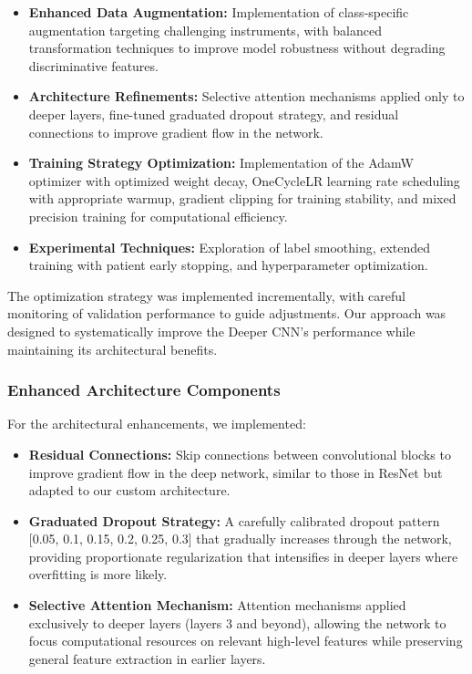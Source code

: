\begin{itemize}
    \item \textbf{Enhanced Data Augmentation:} Implementation of class-specific augmentation targeting challenging instruments, with balanced transformation techniques to improve model robustness without degrading discriminative features.
    
    \item \textbf{Architecture Refinements:} Selective attention mechanisms applied only to deeper layers, fine-tuned graduated dropout strategy, and residual connections to improve gradient flow in the network.
    
    \item \textbf{Training Strategy Optimization:} Implementation of the AdamW optimizer with optimized weight decay, OneCycleLR learning rate scheduling with appropriate warmup, gradient clipping for training stability, and mixed precision training for computational efficiency.
    
    \item \textbf{Experimental Techniques:} Exploration of label smoothing, extended training with patient early stopping, and hyperparameter optimization.
\end{itemize}

The optimization strategy was implemented incrementally, with careful monitoring of validation performance to guide adjustments. Our approach was designed to systematically improve the Deeper CNN's performance while maintaining its architectural benefits.

\subsubsection{Enhanced Architecture Components}
For the architectural enhancements, we implemented:

\begin{itemize}
    \item \textbf{Residual Connections:} Skip connections between convolutional blocks to improve gradient flow in the deep network, similar to those in ResNet but adapted to our custom architecture.
    
    \item \textbf{Graduated Dropout Strategy:} A carefully calibrated dropout pattern [0.05, 0.1, 0.15, 0.2, 0.25, 0.3] that gradually increases through the network, providing proportionate regularization that intensifies in deeper layers where overfitting is more likely.
    
    \item \textbf{Selective Attention Mechanism:} Attention mechanisms applied exclusively to deeper layers (layers 3 and beyond), allowing the network to focus computational resources on relevant high-level features while preserving general feature extraction in earlier layers.
\end{itemize}

